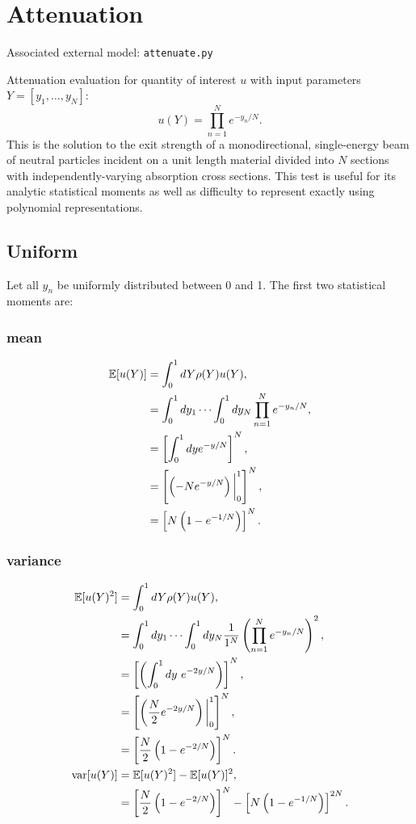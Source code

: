 \section{Attenuation}
Associated external model: \texttt{attenuate.py}

Attenuation evaluation for quantity of interest $u$ with input parameters $Y=[y_1,\ldots,y_N]$:
\begin{equation}
u(Y) = \prod_{n=1}^N e^{-y_n/N}.
\end{equation}
This is the solution to the exit strength of a monodirectional, single-energy beam of neutral particles
incident on a unit length material divided into $N$ sections with independently-varying absorption cross
sections.  This test is useful for its analytic statistical moments as well as difficulty to represent 
exactly using polynomial representations.

\subsection{Uniform}
Let all $y_n$ be uniformly distributed between 0 and 1.  The first two statistical moments are:
\subsubsection{mean}
\begin{align}
\mathbb{E}[ u(Y)] &=\int_{0}^1 dY \rho(Y)u(Y),\notag \\
  &=\int_{0}^1 dy_1\cdots\int_{0}^1 dy_N \prod_{n=1}^N e^{-y_n/N},\notag \\
  &=\left[ \int_{0}^1 dy e^{-y/N}\right]^N,\\
  &=\left[\left(-Ne^{-y/N}\right)\bigg|_0^1\right]^N,\notag \\
  &=\left[N\left(1-e^{-1/N}\right)\right]^N. \notag
\end{align}
\subsubsection{variance}
\begin{align}
\mathbb{E}[ u(Y)^2] &= \int_{0}^1 dY \rho(Y)u(Y), \notag \\
  &=\int_{0}^1 dy_1\cdots\int_{0}^1 dy_N \frac{1}{1^N} \left(\prod_{n=1}^N e^{-y_n/N}\right)^2,\notag \\
  &=\left[\left(\int_{0}^1 dy\ e^{-2y/N} \right)\right]^N,\notag \\
  &=\left[\left(\frac{N}{2}e^{-2y/N} \right)\bigg|_{0}^1 \right]^N, \\
  &=\left[\frac{N}{2}\left(1-e^{-2/N}\right)\right]^N.\notag \\
\text{var}[u(Y)] &= \mathbb{E}[ u(Y)^2]-\mathbb{E}[ u(Y)]^2, \notag \\
  &= \left[\frac{N}{2}\left(1-e^{-2/N}\right)\right]^N - \left[N\left(1-e^{-1/N}\right)\right]^{2N}.
\end{align}
